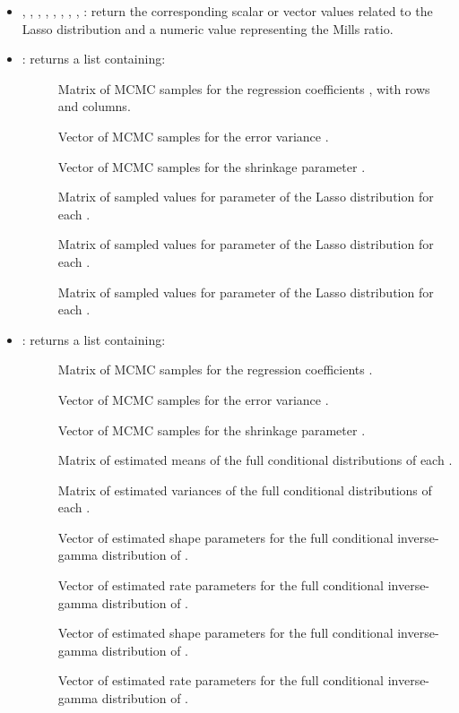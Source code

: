 \documentclass[a4paper]{book}
\begin{document}
\begin{Value}
\begin{itemize}


\item{} , , , , , , , , : 
return the corresponding scalar or vector values related to the Lasso distribution and a numeric value representing the Mills ratio.
\item{} : returns a list containing:
\begin{description}

\item[] Matrix of MCMC samples for the regression coefficients \eqn{\beta}{}, with  rows and  columns.
\item[] Vector of MCMC samples for the error variance .
\item[] Vector of MCMC samples for the shrinkage parameter .
\item[] Matrix of sampled values for parameter  of the Lasso distribution for each .
\item[] Matrix of sampled values for parameter  of the Lasso distribution for each .
\item[] Matrix of sampled values for parameter  of the Lasso distribution for each .

\end{description}

\item{} : returns a list containing:
\begin{description}

\item[] Matrix of MCMC samples for the regression coefficients \eqn{\beta}{}.
\item[] Vector of MCMC samples for the error variance .
\item[] Vector of MCMC samples for the shrinkage parameter .
\item[] Matrix of estimated means of the full conditional distributions of each .
\item[] Matrix of estimated variances of the full conditional distributions of each .
\item[] Vector of estimated shape parameters for the full conditional inverse-gamma distribution of .
\item[] Vector of estimated rate parameters for the full conditional inverse-gamma distribution of .
\item[] Vector of estimated shape parameters for the full conditional inverse-gamma distribution of .
\item[] Vector of estimated rate parameters for the full conditional inverse-gamma distribution of .


\end{description}
\end{itemize}
\end{Value}
\end{document}

